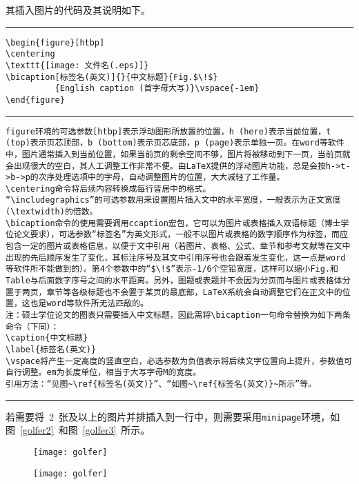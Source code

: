 其插入图片的代码及其说明如下。
\vspace{1em}\noindent\hrule
\begin{lstlisting}
\begin{figure}[htbp]
\centering
\texttt{[image: 文件名(.eps)]}
\bicaption[标签名(英文)]{}{中文标题}{Fig.$\!$}
          {English caption (首字母大写)}\vspace{-1em}
\end{figure}
\end{lstlisting}
\noindent\hrule
\begin{lstlisting}
figure环境的可选参数[htbp]表示浮动图形所放置的位置，h (here)表示当前位置，t (top)表示页芯顶部，b (bottom)表示页芯底部，p (page)表示单独一页。在word等软件中，图片通常插入到当前位置，如果当前页的剩余空间不够，图片将被移动到下一页，当前页就会出现很大的空白，其人工调整工作非常不便。由LaTeX提供的浮动图片功能，总是会按h->t->b->p的次序处理选项中的字母，自动调整图片的位置，大大减轻了工作量。
\centering命令将后续内容转换成每行皆居中的格式。
“\includegraphics”的可选参数用来设置图片插入文中的水平宽度，一般表示为正文宽度(\textwidth)的倍数。
\bicaption命令的使用需要调用ccaption宏包，它可以为图片或表格插入双语标题（博士学位论文要求），可选参数“标签名”为英文形式，一般不以图片或表格的数字顺序作为标签，而应包含一定的图片或表格信息，以便于文中引用（若图片、表格、公式、章节和参考文献等在文中出现的先后顺序发生了变化，其标注序号及其文中引用序号也会跟着发生变化，这一点是word等软件所不能做到的）。第4个参数中的“$\!$”表示-1/6个空铅宽度，这样可以缩小Fig.和Table与后面数字序号之间的水平距离。另外，图题或表题并不会因为分页而与图片或表格体分置于两页，章节等各级标题也不会置于某页的最底部，LaTeX系统会自动调整它们在正文中的位置，这也是word等软件所无法匹敌的。
注：硕士学位论文的图表只需要插入中文标题，因此需将\bicaption一句命令替换为如下两条命令（下同）：
\caption{中文标题}
\label{标签名(英文)}
\vspace将产生一定高度的竖直空白，必选参数为负值表示将后续文字位置向上提升，参数值可自行调整。em为长度单位，相当于大写字母M的宽度。
引用方法：“见图~\ref{标签名(英文)}”、“如图~\ref{标签名(英文)}~所示”等。
\end{lstlisting}
\noindent\hrule\vspace{1em}
若需要将~2~张及以上的图片并排插入到一行中，则需要采用\verb|minipage|环境，如图~\ref{golfer2}~和图~\ref{golfer3}~所示。
\begin{figure}[htbp]
\centering
\begin{minipage}{0.4\textwidth}
\centering
\texttt{[image: golfer]}
\end{minipage}
\begin{minipage}{0.4\textwidth}
\centering
\texttt{[image: golfer]}
\end{minipage}\vspace{-1em}
\end{figure}

